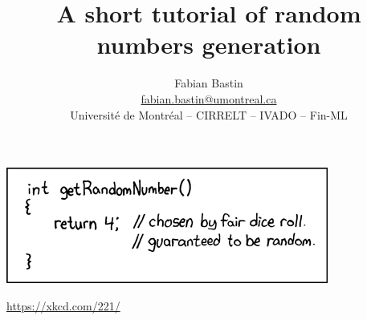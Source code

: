 \documentclass{beamer}
\title[Random Numbers Generation]{A short tutorial of random numbers generation}
\author[Fabian Bastin]{Fabian Bastin \\ \url{fabian.bastin@umontreal.ca} \\ Université de Montréal -- CIRRELT -- IVADO -- Fin-ML}
\date{}
\begin{document}
	
	\frame{\titlepage}
	
\begin{frame}

\begin{center}
	\href{https://xkcd.com/221/}{\includegraphics[scale=0.75]{imgs/random_number.png}}
\begin{small}
	\url{https://xkcd.com/221/}
\end{small}
\end{center}





\end{frame}
	
\end{document}
